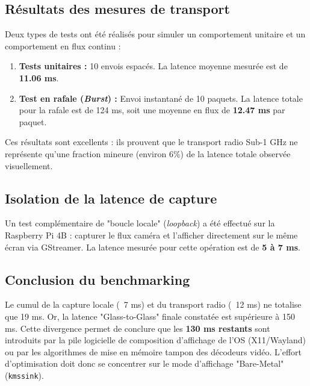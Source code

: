 \subsection{Résultats des mesures de transport}
Deux types de tests ont été réalisés pour simuler un comportement unitaire et un comportement en flux continu :
\begin{enumerate}
    \item \textbf{Tests unitaires :} 10 envois espacés. La latence moyenne mesurée est de \textbf{11.06 ms}.
    \item \textbf{Test en rafale (\textit{Burst}) :} Envoi instantané de 10 paquets. La latence totale pour la rafale est de 124 ms, soit une moyenne en flux de \textbf{12.47 ms} par paquet.
\end{enumerate}

Ces résultats sont excellents : ils prouvent que le transport radio Sub-1 GHz ne représente qu'une fraction mineure (environ 6\%) de la latence totale observée visuellement.

\subsection{Isolation de la latence de capture}
Un test complémentaire de "boucle locale" (\textit{loopback}) a été effectué sur la Raspberry Pi 4B : capturer le flux caméra et l'afficher directement sur le même écran via GStreamer. 
La latence mesurée pour cette opération est de \textbf{5 à 7 ms}. 

\subsection{Conclusion du benchmarking}
Le cumul de la capture locale (~7 ms) et du transport radio (~12 ms) ne totalise que 19 ms. Or, la latence "Glass-to-Glass" finale constatée est supérieure à 150 ms. 
Cette divergence permet de conclure que les \textbf{130 ms restants} sont introduits par la pile 
logicielle de composition d'affichage de l'OS (X11/Wayland) ou par les algorithmes de mise en mémoire 
tampon des décodeurs vidéo. L'effort d'optimisation doit donc se concentrer sur le mode d'affichage 
"Bare-Metal" (\texttt{kmssink}).
